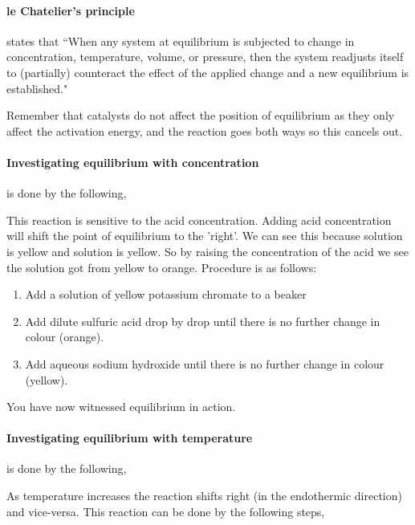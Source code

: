 	\paragraph{le Chatelier’s principle} states that ``When any system at equilibrium is subjected to change in concentration, temperature, volume, or pressure, then the system readjusts itself to (partially) counteract the effect of the applied change and a new equilibrium is established."
	
	Remember that catalysts do not affect the position of equilibrium as they only affect the activation energy, and the reaction goes both ways so this cancels out.
	
	\paragraph{Investigating equilibrium with concentration} is done by the following,
	
	\begin{center}
	\end{center}
	This reaction is sensitive to the acid concentration. Adding acid concentration will shift the point of equilibrium to the 'right'.
	We can see this because  solution is yellow and  solution is yellow.
	So by raising the concentration of the acid we see the solution got from yellow to orange.
	Procedure is as follows:
	\begin{enumerate}
		\item Add a solution of yellow potassium chromate to a beaker
		\item Add dilute sulfuric acid drop by drop until there is no further change in colour (orange).
		\item Add aqueous sodium hydroxide until there is no further change in colour (yellow).
	\end{enumerate}
	You have now witnessed equilibrium in action.
	\paragraph{Investigating equilibrium with temperature} is done by the following,
	
	\begin{center}
	\end{center}
	As temperature increases the reaction shifts right (in the endothermic direction) and vice-versa. This reaction can be done by the following steps,
	
